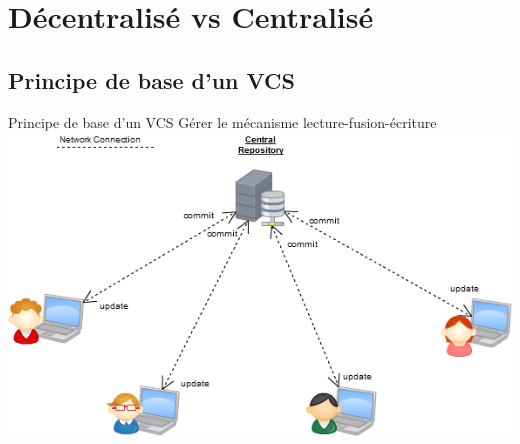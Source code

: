 \section{Décentralisé vs Centralisé}
\subsection{Principe de base d'un VCS}
\begin{frame}{Principe de base d'un VCS}
  Gérer le mécanisme lecture-fusion-écriture
  \includegraphics[width=\textwidth]{./diapo1.png}
\end{frame}

